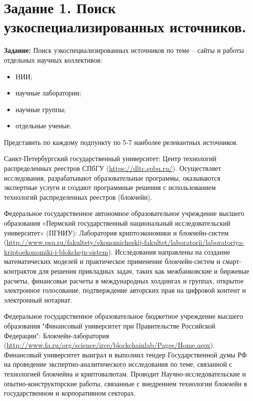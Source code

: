 \documentclass[a4paper, 12pt]{report}		%
\begin{document}
\tableofcontents

\chapter*{Задание 1. Поиск узкоспециализированных источников.}

\textbf{Задание:} Поиск узкоспециализированных источников по теме – сайты и работы отдельных научных коллективов:

\begin{itemize}
\item НИИ;
\item научные лаборатории;
\item научные группы;
\item отдельные ученые.
\end{itemize}

Представить по каждому подпункту по 5-7 наиболее релевантных источников.

\vspace{1cm}

Санкт-Петербургский государственный университет: Центр технологий распределенных
реестров СПбГУ (\url{https://dltc.spbu.ru/}). Осуществляет исследования, разрабатывают образовательные программы, оказываются экспертные услуги и создают программные решения с использованием технологий распределенных реестров (блокчейн).

Федеральное государственное автономное образовательное учреждение высшего образования «Пермский государственный национальный исследовательский университет» (ПГНИУ): Лаборатория криптоэкономики и блокчейн-систем (\url{http://www.psu.ru/fakultety/ekonomicheskij-fakultet/laboratorii/laboratoriya-kriptoekonomiki-i-blokchejn-sistem}). Исследования направлены на создание математических моделей и практическое применение блокчейн-систем и смарт-контрактов для решения прикладных задач, таких как межбанковские и биржевые расчеты, финансовые расчеты в международных холдингах и группах, открытое электронное голосование, подтверждение авторских прав на цифровой контент и электронный нотариат.

Федеральное государственное образовательное бюджетное учреждение высшего образования "Финансовый университет при Правительстве Российской Федерации": Блокчейн-лаборатория (\url{http://www.fa.ru/org/science/irce/blockchainlab/Pages/Home.aspx}). Финансовый университет выиграл и выполнил тендер Государственной думы РФ на проведение экспертно-аналитического исследования по теме, связанной с технологией блокчейна и криптовалютам. Проводит Научно-исследовательские и опытно-конструкторские работы, связанные с внедрением технологии блокчейн в государственном и корпоративном секторах.
\end{document}
